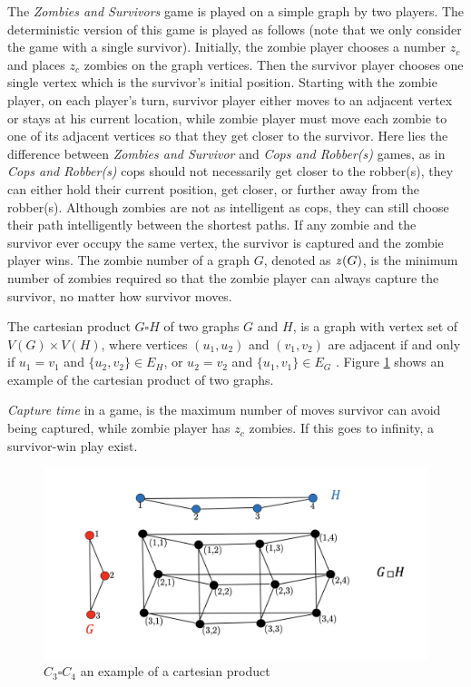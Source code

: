\documentclass[1p]{elsarticle}
\newcommand{\zn}{\ooalign{$z$\cr\hfil\rule[.5ex]{.2em}{.08ex}\hfil\cr}}
\begin{document}
The {\it Zombies and Survivors} game is played on a simple graph by two players. The deterministic version of this game
\cite{Fitz16} is played as follows (note that we only consider the game with a single survivor). Initially, the zombie
player chooses a number $z_c$ and places $z_c$ zombies on the graph vertices. Then the survivor player chooses one single
vertex which is the survivor's initial position. Starting with the zombie player, on each player's turn, survivor player
either moves to an adjacent vertex or stays at his current location, while zombie player must move each zombie to one of
its adjacent vertices so that they get closer to the survivor. Here lies the difference between {\it Zombies and
Survivor} and {\it Cops and Robber(s)} games, as in {\it Cops and Robber(s)} cops should not necessarily get closer to
the robber(s), they can either hold their current position, get closer, or further away from the robber(s). Although
zombies are not as intelligent as cops, they can still choose their path intelligently between the shortest paths.
If any zombie and the survivor ever occupy the same vertex, the survivor is captured and the zombie player wins. The
zombie number of a graph $G$, denoted as $\zn(G)$, is the minimum number of zombies required so that the zombie player can
always capture the survivor, no matter how survivor moves.

The cartesian product $G \square H$ of two graphs $G$ and $H$, is a graph with vertex set of $V(G) \times V(H)$, where
vertices $(u_1 , u_2)$ and $(v_1 , v_2)$ are adjacent if and only if $u_1 = v_1$ and $ \{ u_2 , v_2 \} \in E_{H} $, or
$u_2 = v_2$ and $ \{u_1 , v_1 \} \in E_{G}$ \cite{West02}. Figure \ref{fig:p2} shows an example of the cartesian product
of two graphs.

{\it Capture time} in a game, is the maximum number of moves survivor can avoid being captured, while zombie player has
$z_c$ zombies. If this goes to infinity, a survivor-win play exist.

\begin{figure}[h!]
	\centering
	\includegraphics[width=0.9\linewidth]{fig/CpWest.png}
	\caption{$C_3 \square C_4$ an example of a cartesian product}
	\label{fig:p2}
\end{figure}
\end{document}
